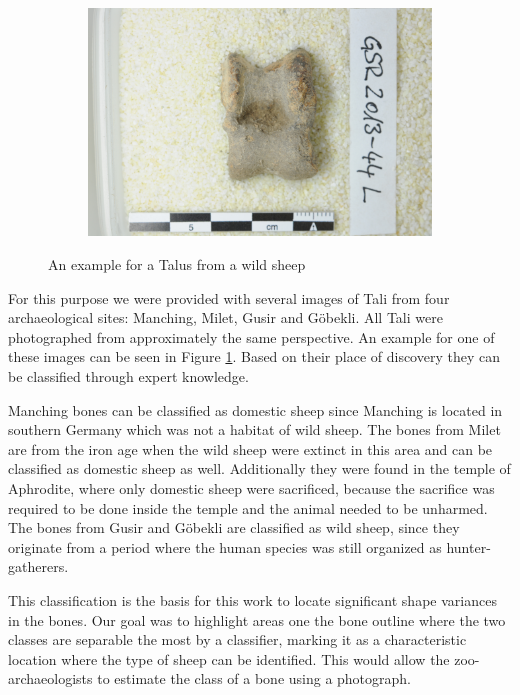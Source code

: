 \documentclass[pdftex,12pt,a4paper]{report}
\begin{document}
\begin{figure}[h]
	\centering
	\begin{subfigure}[b]{0.65\textwidth}
		\centering
		\includegraphics[width=.9\linewidth]{img/example.jpg}
	\end{subfigure}
	\caption{An example for a Talus from a wild sheep}
	\label{fig:problem-example}
\end{figure}


For this purpose we were provided with several images of Tali from four archaeological sites: Manching, Milet, Gusir and Göbekli. All Tali were photographed from approximately the same perspective. An example for one of these images can be seen in Figure \ref{fig:problem-example}. Based on their place of discovery they can be classified through expert knowledge.

Manching bones can be classified as domestic sheep since Manching is located in southern Germany which was not a habitat of wild sheep. The bones from Milet are from the iron age when the wild sheep were extinct in this area and can be classified as domestic sheep as well. Additionally they were found in the temple of Aphrodite, where only domestic sheep were sacrificed, because the sacrifice was required to be done inside the temple and the animal needed to be unharmed. The bones from Gusir and Göbekli are classified as wild sheep, since they originate from a period where the human species was still organized as hunter-gatherers.

This classification is the basis for this work to locate significant shape variances in the bones. Our goal was to highlight areas one the bone outline where the two classes are separable the most by a classifier, marking it as a characteristic location where the type of sheep can be identified. This would allow the zoo-archaeologists to estimate the class of a bone using a photograph.
\end{document}

